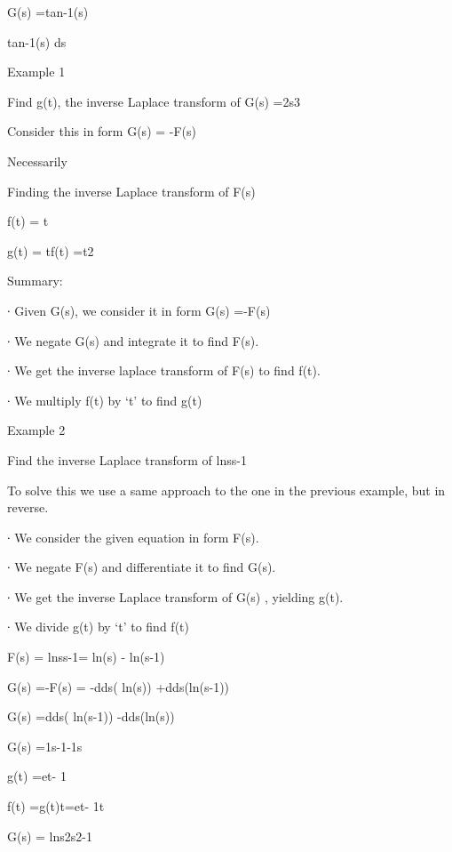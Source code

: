 G(s) =tan-1(s)


tan-1(s) ds



Example 1

Find g(t), the inverse Laplace transform of G(s) =2s3

Consider this in form G(s) = -F(s)

Necessarily 

 

Finding the inverse Laplace transform of F(s)

 

f(t) = t

 


g(t) = tf(t) =t2

 

Summary:

∙       Given G(s), we consider it in form G(s) =-F(s)

∙       We negate G(s) and integrate it to find F(s).

∙       We get the inverse laplace transform of F(s) to find f(t).

∙       We multiply f(t) by ‘t’ to find g(t)

 

Example 2

Find the inverse Laplace transform of lnss-1

 

To solve this we use a same approach to the one in the previous example, but in reverse.

 

∙       We consider the given equation in form F(s).

∙       We negate F(s) and differentiate it to find G(s).

∙       We get the inverse Laplace transform of G(s) , yielding g(t).

∙       We divide g(t) by ‘t’ to find f(t)

 

 F(s) = lnss-1= ln(s) - ln(s-1)           

G(s) =-F(s) = -dds( ln(s)) +dds(ln(s-1))


G(s) =dds( ln(s-1)) -dds(ln(s))


G(s) =1s-1-1s


g(t) =et- 1


f(t) =g(t)t=et- 1t



 

G(s) = lns2s2-1


